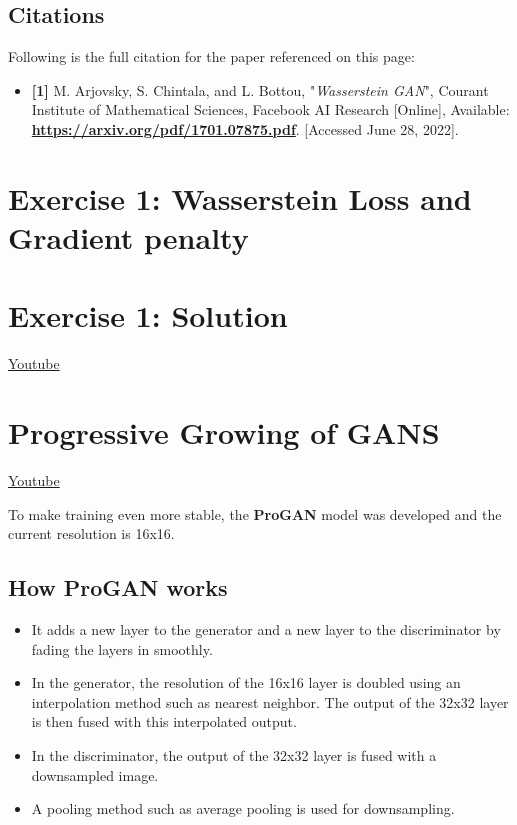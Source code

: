 \subsection{Citations}
Following is the full citation for the paper referenced on this page: 
\begin{itemize}
    \item \textbf{[1]} M. Arjovsky, S. Chintala, and L. Bottou, "\textit{Wasserstein GAN}", Courant Institute of Mathematical Sciences, Facebook AI Research [Online], Available: \href{https://arxiv.org/pdf/1701.07875.pdf}{\textbf{https://arxiv.org/pdf/1701.07875.pdf}}. [Accessed June 28, 2022].
\end{itemize}

\section{Exercise 1: Wasserstein Loss and Gradient penalty}


\section{Exercise 1: Solution}
\href{https://www.youtube.com/watch?v=XcwpaN_qMLE}{Youtube}

\section{Progressive Growing of GANS}
\href{https://www.youtube.com/watch?v=jnVQRG0ocjk}{Youtube} \newline

To make training even more stable, the \textbf{ProGAN} model was developed and the current resolution is 16x16.
\subsection{How ProGAN works}
\begin{itemize}
    \item It adds a new layer to the generator and a new layer to the discriminator by fading the layers in smoothly.
    \item In the generator, the resolution of the 16x16 layer is doubled using an interpolation method such as nearest neighbor. The output of the 32x32 layer is then fused with this interpolated output.
    \item In the discriminator, the output of the 32x32 layer is fused with a downsampled image.
    \item A pooling method such as average pooling is used for downsampling.
\end{itemize}

